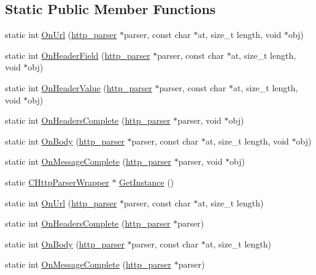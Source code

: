 \subsection*{Static Public Member Functions}
\begin{DoxyCompactItemize}
\item 
static int \hyperlink{class_c_http_parser_wrapper_a1b3842eeed6852aa8b724f555a729837}{On\+Url} (\hyperlink{structhttp__parser}{http\+\_\+parser} $\ast$parser, const char $\ast$at, size\+\_\+t length, void $\ast$obj)
\item 
static int \hyperlink{class_c_http_parser_wrapper_a2393e185ef1cecb21f808466c53c1787}{On\+Header\+Field} (\hyperlink{structhttp__parser}{http\+\_\+parser} $\ast$parser, const char $\ast$at, size\+\_\+t length, void $\ast$obj)
\item 
static int \hyperlink{class_c_http_parser_wrapper_a630bd0b8418280158984dd17f7c3ddb8}{On\+Header\+Value} (\hyperlink{structhttp__parser}{http\+\_\+parser} $\ast$parser, const char $\ast$at, size\+\_\+t length, void $\ast$obj)
\item 
static int \hyperlink{class_c_http_parser_wrapper_a1b5d26dff5126716f2a1db491991041e}{On\+Headers\+Complete} (\hyperlink{structhttp__parser}{http\+\_\+parser} $\ast$parser, void $\ast$obj)
\item 
static int \hyperlink{class_c_http_parser_wrapper_a6d175dabbaaf04c6f760c1bda80fcb9d}{On\+Body} (\hyperlink{structhttp__parser}{http\+\_\+parser} $\ast$parser, const char $\ast$at, size\+\_\+t length, void $\ast$obj)
\item 
static int \hyperlink{class_c_http_parser_wrapper_af20a9dd4cc1705825278662f33e7b594}{On\+Message\+Complete} (\hyperlink{structhttp__parser}{http\+\_\+parser} $\ast$parser, void $\ast$obj)
\item 
static \hyperlink{class_c_http_parser_wrapper}{C\+Http\+Parser\+Wrapper} $\ast$ \hyperlink{class_c_http_parser_wrapper_afa738e8644efdd2517858cd967f8cc02}{Get\+Instance} ()
\item 
static int \hyperlink{class_c_http_parser_wrapper_a308ca34453d52f3c9bf2eb5a80c84faa}{On\+Url} (\hyperlink{structhttp__parser}{http\+\_\+parser} $\ast$parser, const char $\ast$at, size\+\_\+t length)
\item 
static int \hyperlink{class_c_http_parser_wrapper_a7a1b7ed56f544551207b59ed59e3d3f9}{On\+Headers\+Complete} (\hyperlink{structhttp__parser}{http\+\_\+parser} $\ast$parser)
\item 
static int \hyperlink{class_c_http_parser_wrapper_a2eaba9bb1582a290d83b8b46d0d465d5}{On\+Body} (\hyperlink{structhttp__parser}{http\+\_\+parser} $\ast$parser, const char $\ast$at, size\+\_\+t length)
\item 
static int \hyperlink{class_c_http_parser_wrapper_a15417c5c2390182dc09b3398cee29e76}{On\+Message\+Complete} (\hyperlink{structhttp__parser}{http\+\_\+parser} $\ast$parser)
\end{DoxyCompactItemize}
